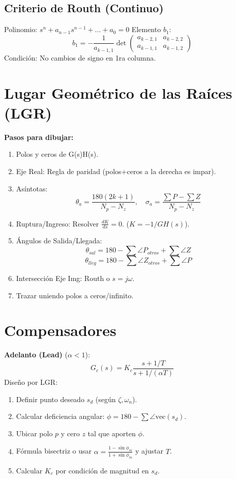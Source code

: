 \documentclass[legalpaper,twocolumn]{article}
\begin{document}
\subsection*{Criterio de Routh (Continuo)}
Polinomio: \( s^n + a_{n-1}s^{n-1} + \dots + a_0 = 0 \)
Elemento $b_1$:
\[ b_1 = -\frac{1}{a_{k-1,1}} \det \begin{pmatrix} a_{k-2,1} & a_{k-2,2} \\ a_{k-1,1} & a_{k-1,2} \end{pmatrix} \]
Condición: No cambios de signo en 1ra columna.

\section*{Lugar Geométrico de las Raíces (LGR)}
\textbf{Pasos para dibujar:}
\begin{enumerate}[leftmargin=*,nosep]
    \item Polos y ceros de G(s)H(s).
    \item Eje Real: Regla de paridad (polos+ceros a la derecha es impar).
    \item Asíntotas:
    \[ \theta_a = \frac{180(2k+1)}{N_p - N_z}, \quad \sigma_a = \frac{\sum P - \sum Z}{N_p - N_z} \]
    \item Ruptura/Ingreso: Resolver $\frac{dK}{ds} = 0$. ($K = -1/GH(s)$).
    \item Ángulos de Salida/Llegada:
    \[ \theta_{sal} = 180 - \sum \angle P_{otros} + \sum \angle Z \]
    \[ \theta_{lleg} = 180 - \sum \angle Z_{otros} + \sum \angle P \]
    \item Intersección Eje Img: Routh o $s=j\omega$.
    \item Trazar uniendo polos a ceros/infinito.
\end{enumerate}

\section*{Compensadores}
\textbf{Adelanto (Lead)} ($\alpha < 1$):
\[ G_c(s) = K_c \frac{s + 1/T}{s + 1/(\alpha T)} \]
Diseño por LGR:
\begin{enumerate}[leftmargin=*,nosep]
    \item Definir punto deseado $s_d$ (según $\zeta, \omega_n$).
    \item Calcular deficiencia angular: $\phi = 180 - \sum \angle \text{vec}(s_d)$.
    \item Ubicar polo $p$ y cero $z$ tal que aporten $\phi$.
    \item Fórmula bisectriz o usar $\alpha = \frac{1-\sin \phi_m}{1+\sin \phi_m}$ y ajustar $T$.
    \item Calcular $K_c$ por condición de magnitud en $s_d$.
\end{enumerate}
\end{document}
